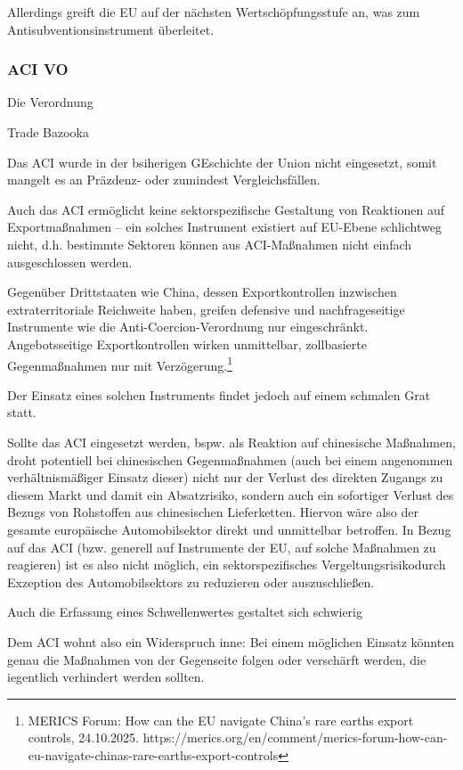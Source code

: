 \documentclass[12pt,a4paper,oneside]{book} %
\begin{document}
Allerdings greift die EU auf der nächsten Wertschöpfungsstufe an, was zum Antisubventionsinstrument überleitet.

\subsubsection{ACI VO}
Die Verordnung 

Trade Bazooka

Das ACI wurde in der bsiherigen GEschichte der Union nicht eingesetzt, somit mangelt es an Präzdenz- oder zumindest Vergleichsfällen.

Auch das ACI ermöglicht keine sektorspezifische Gestaltung von Reaktionen auf Exportmaßnahmen -- ein solches Instrument existiert auf EU-Ebene schlichtweg nicht, d.h. bestimmte Sektoren können aus ACI-Maßnahmen nicht einfach ausgeschlossen werden.

Gegenüber Drittstaaten wie China, dessen Exportkontrollen inzwischen extraterritoriale Reichweite haben, greifen defensive und nachfrageseitige Instrumente wie die Anti-Coercion-Verordnung nur eingeschränkt. Angebotsseitige Exportkontrollen wirken unmittelbar, zollbasierte Gegenmaßnahmen nur mit Verzögerung.\footnote{MERICS Forum: How can the EU navigate China’s rare earths export controls, 24.10.2025. https://merics.org/en/comment/merics-forum-how-can-eu-navigate-chinas-rare-earths-export-controls}


Der Einsatz eines solchen Instruments findet jedoch auf einem schmalen Grat statt. 

Sollte das ACI eingesetzt werden, bspw. als Reaktion auf chinesische Maßnahmen, droht potentiell bei chinesischen Gegenmaßnahmen (auch bei einem angenommen verhältnismäßiger Einsatz dieser) nicht nur der Verlust des direkten Zugangs zu diesem Markt und damit ein Absatzrisiko, sondern auch ein sofortiger Verlust des Bezugs von Rohstoffen aus chinesischen Lieferketten. Hiervon wäre also der gesamte europäische Automobilsektor direkt und unmittelbar betroffen. In Bezug auf das ACI (bzw. generell auf Instrumente der EU, auf solche Maßnahmen zu reagieren) ist es also nicht möglich, ein sektorspezifisches \glqq Vergeltungsrisiko\grqq durch Exzeption des Automobilsektors zu reduzieren oder auszuschließen.

Auch die Erfassung eines Schwellenwertes gestaltet sich schwierig

Dem ACI wohnt also ein Widerspruch inne: Bei einem möglichen Einsatz könnten genau die Maßnahmen von der Gegenseite folgen oder verschärft werden, die iegentlich verhindert werden sollten.
\end{document}
